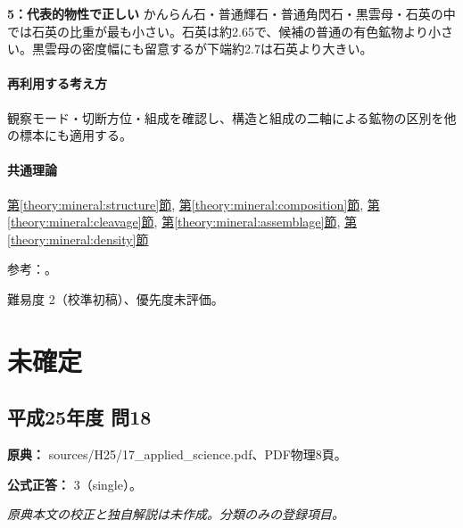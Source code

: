 \noindent\textbf{5：代表的物性で正しい} かんらん石・普通輝石・普通角閃石・黒雲母・石英の中では石英の比重が最も小さい。石英は約2.65で、候補の普通の有色鉱物より小さい。黒雲母の密度幅にも留意するが下端約2.7は石英より大きい。\par

\paragraph{再利用する考え方} 観察モード・切断方位・組成を確認し、構造と組成の二軸による鉱物の区別を他の標本にも適用する。

\paragraph{共通理論} \hyperref[theory:mineral:structure]{第\ref*{theory:mineral:structure}節}, \hyperref[theory:mineral:composition]{第\ref*{theory:mineral:composition}節}, \hyperref[theory:mineral:cleavage]{第\ref*{theory:mineral:cleavage}節}, \hyperref[theory:mineral:assemblage]{第\ref*{theory:mineral:assemblage}節}, \hyperref[theory:mineral:density]{第\ref*{theory:mineral:density}節}

\par 参考：\cite{hom_quartz,hom_biotite,hom_forsterite,hom_augite}。

\par 難易度 2（校準初稿）、優先度未評価。

\section{未確定}

\subsection{平成25年度 問18}
\label{q:h25-reg-applied-18}

\noindent\textbf{原典：} sources/H25/17\_applied\_science.pdf、PDF物理8頁。

\textbf{公式正答：} 3（single）。

\par\textit{原典本文の校正と独自解説は未作成。分類のみの登録項目。}

